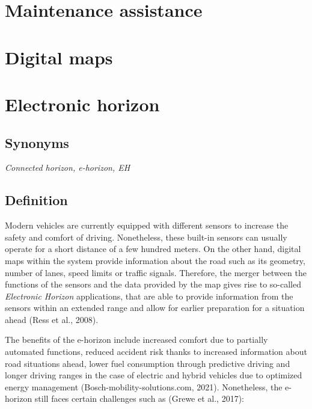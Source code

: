\documentclass[
]{book}
\begin{document}
\hypertarget{maintenance_assis}{%
\section{Maintenance assistance}\label{maintenance_assis}}

\hypertarget{digital_maps}{%
\section{Digital maps}\label{digital_maps}}

\hypertarget{ehorizon}{%
\section{Electronic horizon}\label{ehorizon}}

\hypertarget{synonyms-13}{%
\subsection*{Synonyms}\label{synonyms-13}}

\emph{Connected horizon, e-horizon, EH}

\hypertarget{definition-15}{%
\subsection*{Definition}\label{definition-15}}

Modern vehicles are currently equipped with different sensors to increase the safety and comfort of driving. Nonetheless, these built-in sensors can usually operate for a short distance of a few hundred meters. On the other hand, digital maps within the system provide information about the road such as its geometry, number of lanes, speed limits or traffic signals. Therefore, the merger between the functions of the sensors and the data provided by the map gives rise to so-called \emph{Electronic Horizon} applications, that are able to provide information from the sensors within an extended range and allow for earlier preparation for a situation ahead (Ress et al., 2008).

The benefits of the e-horizon include increased comfort due to partially automated functions, reduced accident risk thanks to increased information about road situations ahead, lower fuel consumption through predictive driving and longer driving ranges in the case of electric and hybrid vehicles due to optimized energy management (Bosch-mobility-solutions.com, 2021). Nonetheless, the e-horizon still faces certain challenges such as (Grewe et al., 2017):
\end{document}
